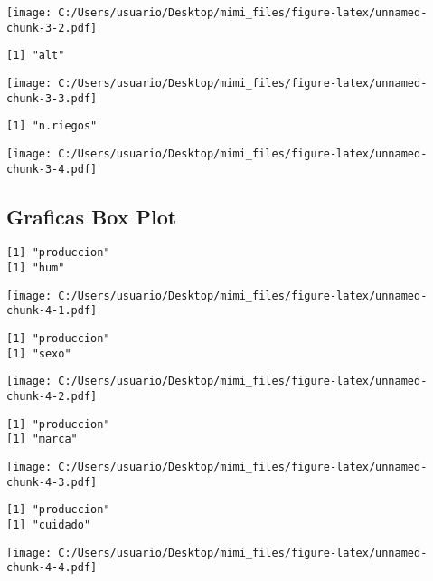 \documentclass[]{article}
\begin{document}
\texttt{[image: C:/Users/usuario/Desktop/mimi\_files/figure-latex/unnamed-chunk-3-2.pdf]}

\begin{verbatim}
[1] "alt"
\end{verbatim}

\texttt{[image: C:/Users/usuario/Desktop/mimi\_files/figure-latex/unnamed-chunk-3-3.pdf]}

\begin{verbatim}
[1] "n.riegos"
\end{verbatim}

\texttt{[image: C:/Users/usuario/Desktop/mimi\_files/figure-latex/unnamed-chunk-3-4.pdf]}

\subsection{Graficas Box Plot}\label{graficas-box-plot}

\begin{verbatim}
[1] "produccion"
[1] "hum"
\end{verbatim}

\texttt{[image: C:/Users/usuario/Desktop/mimi\_files/figure-latex/unnamed-chunk-4-1.pdf]}

\begin{verbatim}
[1] "produccion"
[1] "sexo"
\end{verbatim}

\texttt{[image: C:/Users/usuario/Desktop/mimi\_files/figure-latex/unnamed-chunk-4-2.pdf]}

\begin{verbatim}
[1] "produccion"
[1] "marca"
\end{verbatim}

\texttt{[image: C:/Users/usuario/Desktop/mimi\_files/figure-latex/unnamed-chunk-4-3.pdf]}

\begin{verbatim}
[1] "produccion"
[1] "cuidado"
\end{verbatim}

\texttt{[image: C:/Users/usuario/Desktop/mimi\_files/figure-latex/unnamed-chunk-4-4.pdf]}
\end{document}
